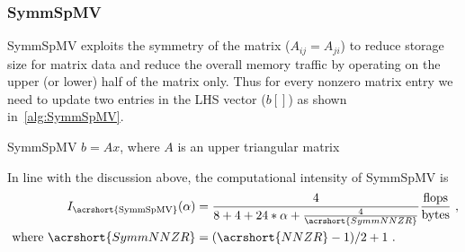 \subsubsection{\acrshort{SymmSpMV}}
\label{sect:SymmSpmv}

\Acrshort{SymmSpMV} exploits the symmetry of the matrix ($A_{ij}=A_{ji}$) to reduce storage size for matrix data and reduce the overall memory traffic by operating on the upper (or lower) half of the matrix only. Thus for every nonzero matrix entry we need to update two entries in the LHS vector ($b[]$) as shown in~\cref{alg:SymmSpMV}.
\begin{algorithm}[tbp]
	\caption{SymmSpMV $b=Ax$, where $A$ is an upper triangular matrix} 
	\label{alg:SymmSpMV}
	\begin{algorithmic}[1]
			\ENDFOR
		\ENDFOR
	\end{algorithmic}
\end{algorithm}
In line with the discussion above, the computational intensity of \acrshort{SymmSpMV} is
\begin{align}
\label{eq:SymmSpMV_intensity}
I_\mathrm{\acrshort{SymmSpMV}} (\alpha) &= \frac{4}{8+4+24*\alpha+\frac{4}{\acrshort{SymmNNZR}}} \frac{\FLOP}{\BYTE}\cma\\
\label{eq:NNZR_symm}
\text{ where  } \acrshort{SymmNNZR} &= (\acrshort{NNZR}-1)/2 + 1\eos
\end{align}

